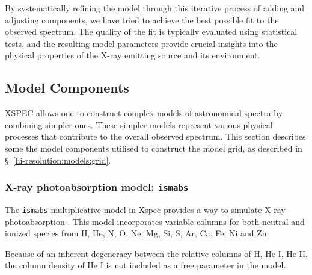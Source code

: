 			By systematically refining the model through this iterative process of adding and adjusting components, we have tried to achieve the best possible fit to the observed spectrum. The quality of the fit is typically evaluated using statistical tests, and the resulting model parameters provide crucial insights into the physical properties of the X-ray emitting source and its environment.
	  
	
		\subsection{Model Components} \label{hi-resolution:models:components}
			XSPEC allows one to construct complex models of astronomical spectra by combining simpler ones. These simpler models represent various physical processes that contribute to the overall observed spectrum. This section describes some the model components utilised to construct the model grid, as described in \S\ \ref{hi-resolution:models:grid}.
		
			\subsubsection{X-ray photoabsorption model: \texttt{ismabs}}
			The \texttt{ismabs} multiplicative model in Xspec provides a way to simulate X-ray photoabsorption \cite{ismabs_gatuzz}. This model incorporates variable columns for both neutral and ionized species from H, He, N, O, Ne, Mg, Si, S, Ar, Ca, Fe, Ni and Zn.
			
			Because of an inherent degeneracy between the relative columns of H, He I, He II, the column density of He I is not included as a free parameter in the model.
			
